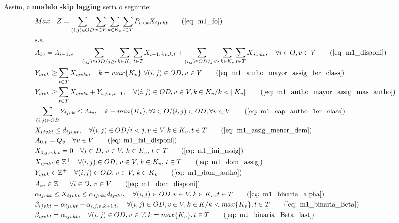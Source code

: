 Assim, o \textbf{modelo skip lagging} seria o seguinte:
\allowdisplaybreaks
\begin{align}
	& Max \quad Z = \sum_{(i,j)\in OD} \sum_{v\in V} \sum_{k\in K_v} \sum_{t\in T} P_{ijvk} X_{ijvkt}     \tag{\ref{eq: m1_fo}}   \\
	& \text{s.a.}  \notag \\
	& A_{iv} = A_{i-1,v} - \sum_{(i,j) \in OD/j \geq i} \sum_{k\in K_v}\sum_{t\in T}X_{i-1,j,v,k,t} + \sum_{(i,j) \in OD/j<i} \sum_{k\in K_v}\sum_{t\in T}X_{jivkt}, \quad \forall i \in O, v \in V   \tag{\ref{eq: m1_disponi}} \\
	& Y_{ijvk} \geq  \sum_{t \in T} X_{ijvkt},  \quad k = max\{K_v\}, \forall(i,j) \in OD ,v \in V     \tag{\ref{eq: m1_autho_mayor_assig_1er_class}} \\
	& Y_{ijvk} \geq  \sum_{t \in T} X_{ijvkt} + Y_{i,j,v,k + 1} , \quad \forall(i,j) \in OD, v \in V, k \in K_v / k < \lVert K_v \rVert   \tag{\ref{eq: m1_autho_mayor_assig_mas_autho}} \\
	& \sum_{(i,j) \in OD} Y_{ijvk} \leq A_{iv}, \quad  k = min\{K_v\}, \forall i \in O / (i,j) \in OD,   \forall v \in V       \tag{\ref{eq: m1_cap_autho_1er_class}} \\
	& X_{ijvkt} \leq d_{ijvkt},  \quad \forall (i,j) \in OD / i < j  ,v \in V, k \in K_v, t\in T   \tag{\ref{eq: m1_assig_menor_dem}} \\
	& A_{0,v} = Q_v \quad \forall v \in V  \tag{\ref{eq: m1_ini_disponi}} \\ 
	& X_{0,j,v,k,t} = 0 \quad \forall j \in D,\, v \in V,\, k \in K_v,\, t \in T  \tag{\ref{eq: m1_ini_assig}} \\ 
	& X_{ijvkt} \in \mathbb{Z}^+ \quad \forall(i,j) \in OD,\, v \in V,\, k \in K_v,\, t \in T  \tag{\ref{eq: m1_dom_assig}} \\ 
	& Y_{ijvk} \in \mathbb{Z}^+ \quad \forall(i,j) \in OD,\, v \in V,\, k \in K_v  \tag{\ref{eq: m1_dom_autho}} \\ 
	& A_{iv} \in \mathbb{Z}^+ \quad \forall i \in O,\, v \in V  \tag{\ref{eq: m1_dom_disponi}} \\
	& \alpha_{ijvkt} \leq X_{ijvkt} \leq \alpha_{ijvkt}d_{ijvkt}, \quad   \forall(i,j) \in OD, v \in V, k \in K_v, t \in T   \tag{\ref{eq: m1_binaria_alpha}} \\
	& \beta_{ijvkt} = \alpha_{ijvkt} - \alpha_{i,j,v,k+1,t}, \quad \forall (i,j) \in OD, v \in V, k \in K /k < max\{K_v\}, t\in T    \tag{\ref{eq: m1_binaria_Beta}}   \\
	& \beta_{ijvkt} = \alpha_{ijvkt}, \quad   \forall(i,j) \in OD, v \in V, k = max\{K_v\}, t \in T    \tag{\ref{eq: m1_binaria_Beta_last}}   \\

\end{align}
